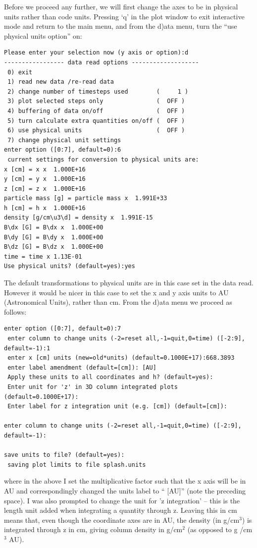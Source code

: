 \documentclass[a4paper,10pt]{article}
\begin{document}
Before we proceed any further, we will first change the axes to be in physical units rather than code units. Pressing `q' in the plot window to exit interactive mode and return to the main menu, and from the d)ata menu, turn the ``use physical units option'' on:
\begin{verbatim}
Please enter your selection now (y axis or option):d
----------------- data read options -------------------
 0) exit 
 1) read new data /re-read data
 2) change number of timesteps used        (     1 )
 3) plot selected steps only               (  OFF )
 4) buffering of data on/off               (  OFF )
 5) turn calculate extra quantities on/off (  OFF )
 6) use physical units                     (  OFF )
 7) change physical unit settings 
enter option ([0:7], default=0):6
 current settings for conversion to physical units are:
x [cm] = x x  1.000E+16
y [cm] = y x  1.000E+16
z [cm] = z x  1.000E+16
particle mass [g] = particle mass x  1.991E+33
h [cm] = h x  1.000E+16
density [g/cm\u3\d] = density x  1.991E-15
B\dx [G] = B\dx x  1.000E+00
B\dy [G] = B\dy x  1.000E+00
B\dz [G] = B\dz x  1.000E+00
time = time x 1.13E-01
Use physical units? (default=yes):yes
\end{verbatim}
 The default transformations to physical units are in this case set in the data read. However it would be nicer in this case to set the x and y axis units to AU (Astronomical Units), rather than cm. From the d)ata menu we proceed as follows:
\begin{verbatim}
enter option ([0:7], default=0):7
 enter column to change units (-2=reset all,-1=quit,0=time) ([-2:9], default=-1):1
 enter x [cm] units (new=old*units) (default=0.1000E+17):668.3893
 enter label amendment (default=[cm]): [AU]
 Apply these units to all coordinates and h? (default=yes):
 Enter unit for 'z' in 3D column integrated plots (default=0.1000E+17):
 Enter label for z integration unit (e.g. [cm]) (default=[cm]):

enter column to change units (-2=reset all,-1=quit,0=time) ([-2:9], default=-1):

save units to file? (default=yes):
 saving plot limits to file splash.units
\end{verbatim}
where in the above I set the multiplicative factor such that the x axis will be in AU and correspondingly changed the units label to `` [AU]'' (note the preceding space). I was also prompted to change the unit for 'z integration' -- this is the length unit added when integrating a quantity through z. Leaving this in cm means that, even though the coordinate axes are in AU, the density (in g/cm$^{3}$) is integrated through z in cm, giving column density in g/cm$^{2}$ (as opposed to g /cm$^{3}$ AU). 
\end{document}
